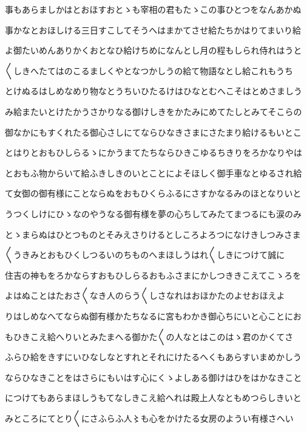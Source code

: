 \documentclass[a4paper,11pt,landscape]{ltjtarticle}
\begin{document}
\par\medskip
事もあらましかはとおほすおとゝも宰相の君もたゝこの事ひとつをなんあかぬ
\par\medskip
事かなとおほしける三日すこしてそうへはまかてさせ給たちかはりてまいり給
\par\medskip
よ御たいめんありかくおとなひ給けちめになんとし月の程もしられ侍れはうと
\par\medskip
〱しきへたてはのこるましくやとなつかしうの給て物語なとし給これもうち
\par\medskip
とけぬるはしめなめり物なとうちいひたるけはひなとむへこそはとめさましう
\par\medskip
み給またいとけたかうさかりなる御けしきをかたみにめてたしとみてそこらの
\par\medskip
御なかにもすくれたる御心さしにてならひなきさまにさたまり給けるもいとこ
\par\medskip
とはりとおもひしらるゝにかうまてたちならひきこゆるちきりをろかなりやは
\par\medskip
とおもふ物からいて給ふきしきのいとことによそほしく御手車なとゆるされ給
\par\medskip
て女御の御有様にことならぬをおもひくらふるにさすかなるみのほとなりいと
\par\medskip
うつくしけにひゝなのやうなる御有様を夢の心ちしてみたてまつるにも涙のみ
\par\medskip
とゝまらぬはひとつものとそみえさりけるとしころよろつになけきしつみさま
\par\medskip
〱うきみとおもひくしつるいのちものへまほしうはれ〱しきにつけて誠に
\par\medskip
住吉の神もをろかならすおもひしらるおもふさまにかしつききこえてこゝろを
\par\medskip
よはぬことはたおさ〱なき人のらう〱しさなれはおほかたのよせおほえよ
\par\medskip
りはしめなへてならぬ御有様かたちなるに宮もわかき御心ちにいと心ことにお
\par\medskip
もひきこえ給へりいとみたまへる御かた〱の人なとはこのはゝ君のかくてさ
\par\medskip
ふらひ給をきすにいひなしなとすれとそれにけたるへくもあらすいまめかしう
\par\medskip
ならひなきことをはさらにもいはす心にくゝよしある御けはひをはかなきこと
\par\medskip
につけてもあらまほしうもてなしきこえ給へれは殿上人なともめつらしきいと
\par\medskip
みところにてとり〱にさふらふ人〻も心をかけたる女房のようい有様さへい
\par\medskip
\end{document}

